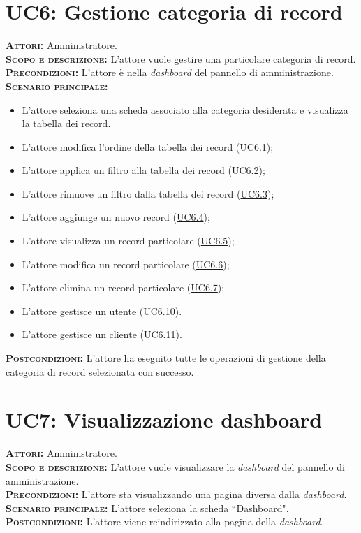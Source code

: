 \section{UC6: Gestione categoria di record}
\label{sec:UC6}
\textsc{\textbf{Attori:}} Amministratore.\\
\textsc{\textbf{Scopo e descrizione:}} L'attore vuole gestire una particolare categoria di record.\\
\textsc{\textsc{\textbf{Precondizioni:}}} L'attore è nella \textit{dashboard} del pannello di amministrazione.\\
\textsc{\textbf{Scenario principale:}} 
\begin{itemize}
    \item L'attore seleziona una scheda associato alla categoria desiderata e visualizza la tabella dei record.
    \item L'attore modifica l'ordine della tabella dei record (\hyperref[sec:UC61]{UC6.1});
    \item L'attore applica un filtro alla tabella dei record (\hyperref[sec:UC62]{UC6.2});
    \item L'attore rimuove un filtro dalla tabella dei record (\hyperref[sec:UC63]{UC6.3});
    \item L'attore aggiunge un nuovo record (\hyperref[sec:UC64]{UC6.4});
    \item L'attore visualizza un record particolare (\hyperref[sec:UC65]{UC6.5});
    \item L'attore modifica un record particolare (\hyperref[sec:UC66]{UC6.6});
    \item L'attore elimina un record particolare (\hyperref[sec:UC67]{UC6.7});
    \item L'attore gestisce un utente (\hyperref[sec:UC610]{UC6.10}).
    \item L'attore gestisce un cliente (\hyperref[sec:UC611]{UC6.11}).
\end{itemize}
\textsc{\textbf{Postcondizioni:}} L'attore ha eseguito tutte le operazioni di gestione della categoria di record selezionata con successo.

\section{UC7: Visualizzazione dashboard}
\label{sec:UC7}
\textsc{\textbf{Attori:}} Amministratore.\\
\textsc{\textbf{Scopo e descrizione:}} L'attore vuole visualizzare la \textit{dashboard} del pannello di amministrazione.\\
\textsc{\textsc{\textbf{Precondizioni:}}} L'attore sta visualizzando una pagina diversa dalla \textit{dashboard}.\\
\textsc{\textbf{Scenario principale:}} L'attore seleziona la scheda ``Dashboard".\\
\textsc{\textbf{Postcondizioni:}} L'attore viene reindirizzato alla pagina della \textit{dashboard}.

